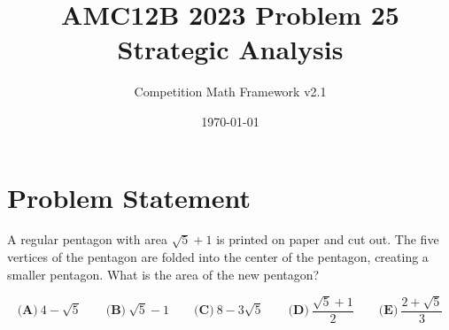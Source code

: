 \documentclass[12pt]{article}
\begin{document}
\title{AMC12B 2023 Problem 25\\Strategic Analysis}
\author{Competition Math Framework v2.1}
\date{\today}
\maketitle

\section*{Problem Statement}

A regular pentagon with area $\sqrt{5}+1$ is printed on paper and cut out. The five vertices of the pentagon are folded into the center of the pentagon, creating a smaller pentagon. What is the area of the new pentagon?

$$\textbf{(A)}~4-\sqrt{5}\qquad\textbf{(B)}~\sqrt{5}-1\qquad\textbf{(C)}~8-3\sqrt{5}\qquad\textbf{(D)}~\frac{\sqrt{5}+1}{2}\qquad\textbf{(E)}~\frac{2+\sqrt{5}}{3}$$
\end{document}
